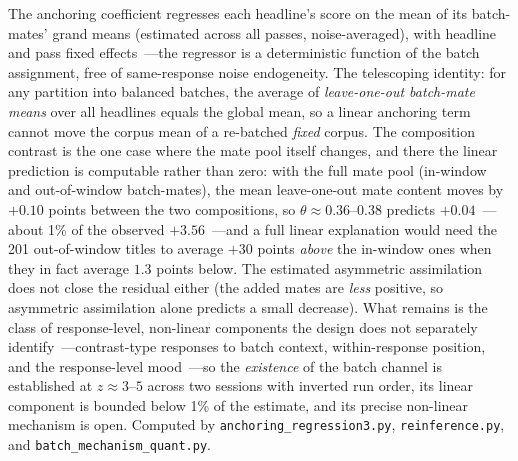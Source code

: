 \begin{table}[htbp]
\begin{tablenotes}[flushleft]
\item The anchoring coefficient regresses each headline's score on the mean of its batch-mates' grand means (estimated across all passes, noise-averaged), with headline and pass fixed effects~---the regressor is a deterministic function of the batch assignment, free of same-response noise endogeneity. The telescoping identity: for any partition into balanced batches, the average of \emph{leave-one-out batch-mate means} over all headlines equals the global mean, so a linear anchoring term cannot move the corpus mean of a re-batched \emph{fixed} corpus. The composition contrast is the one case where the mate pool itself changes, and there the linear prediction is computable rather than zero: with the full mate pool (in-window and out-of-window batch-mates), the mean leave-one-out mate content moves by $+0.10$ points between the two compositions, so $\theta\approx0.36$--$0.38$ predicts $+0.04$~---about 1\% of the observed $+3.56$~---and a full linear explanation would need the 201 out-of-window titles to average $+30$ points \emph{above} the in-window ones when they in fact average $1.3$ points below. The estimated asymmetric assimilation does not close the residual either (the added mates are \emph{less} positive, so asymmetric assimilation alone predicts a small decrease). What remains is the class of response-level, non-linear components the design does not separately identify~---contrast-type responses to batch context, within-response position, and the response-level mood~---so the \emph{existence} of the batch channel is established at $z\approx3$--$5$ across two sessions with inverted run order, its linear component is bounded below 1\% of the estimate, and its precise non-linear mechanism is open. Computed by \texttt{anchoring\_regression3.py}, \texttt{reinference.py}, and \texttt{batch\_mechanism\_quant.py}.
\end{tablenotes}
\end{table}

